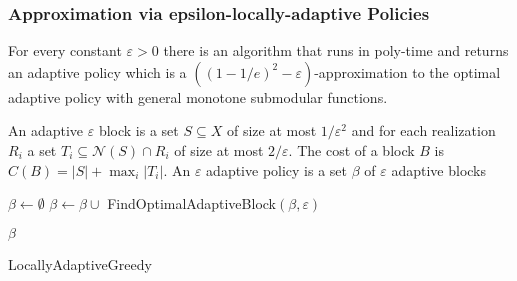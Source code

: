 \subsubsection{Approximation via epsilon-locally-adaptive Policies}
\begin{theorem}
For every constant $\varepsilon>0$ there is an algorithm that runs in poly-time and returns an adaptive policy which is a $((1-1/e)^2-\varepsilon)$-approximation to the optimal adaptive policy with general monotone submodular functions. 
\end{theorem}
\begin{definition}
An adaptive $\varepsilon$ block is a set $S\subseteq X$ of size at most $1/\varepsilon^2$ and for each realization $R_i$ a set $T_i\subseteq\mathcal{N}(S)\cap R_i$ of size at most $2/\varepsilon$. The cost of a block $B$ is $C(B)=|S|+\max_i{|T_i|}$. An $\varepsilon$ adaptive policy is a set $\beta$ of $\varepsilon$ adaptive blocks
\end{definition}

\IncMargin{2em}
\begin{algorithm}[h]
	\LinesNumbered
	$\beta\gets\emptyset$ 
	{
		$\beta\gets \beta\cup$ FindOptimalAdaptiveBlock$(\beta,\varepsilon)$
	}

	\Return $\beta$
	\caption{LocallyAdaptiveGreedy}\label{algo:local}
\end{algorithm}\DecMargin{1em}



